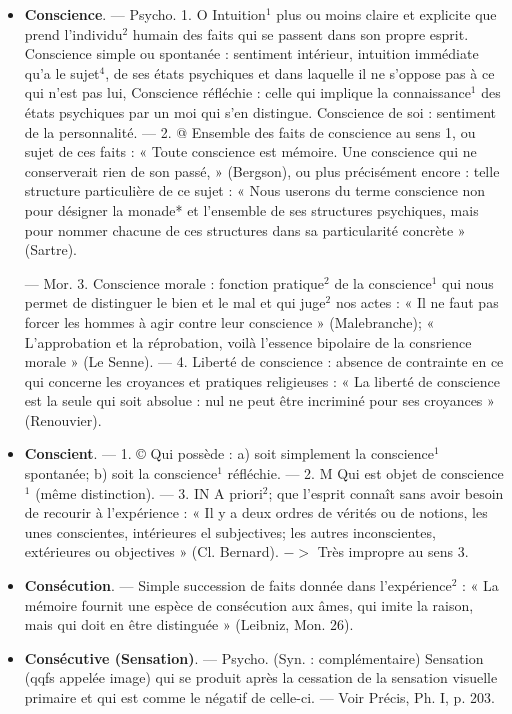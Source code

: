 \begin{itemize}[leftmargin=1cm, label=, itemsep=11pt]
\item {\bf Conscience}. — Psycho. 1. O Intuition$^1$
plus ou moins claire et explicite
que prend l'individu$^2$ humain des
faits qui se passent dans son propre
esprit. Conscience simple ou spontanée : sentiment intérieur, intuition
immédiate qu’a le sujet$^4$, de ses
états psychiques et dans laquelle il
ne s'oppose pas à ce qui n’est pas lui,
Conscience réfléchie : celle qui implique
la connaissance$^1$ des états psychiques par un moi qui s’en distingue. Conscience de soi : sentiment
de la personnalité. — 2. @ Ensemble
des faits de conscience au sens 1, ou
sujet de ces faits : « Toute conscience
est mémoire. Une conscience qui ne
conserverait rien de son passé, »
(Bergson), ou plus précisément encore : telle structure particulière de
ce sujet : « Nous userons du terme
conscience non pour désigner la monade* et l’ensemble de ses structures
psychiques, mais pour nommer chacune de ces structures dans sa particularité concrète » (Sartre).

— Mor. 3. Conscience morale :
fonction pratique$^2$ de la conscience$^1$
qui nous permet de distinguer le
bien et le mal et qui juge$^2$ nos actes :
« Il ne faut pas forcer les hommes à
agir contre leur conscience » (Malebranche); « L’approbation et la
réprobation, voilà l'essence bipolaire de la consrience morale » (Le
Senne). — 4. Liberté de conscience :
absence de contrainte en ce qui
concerne les croyances et pratiques
religieuses : « La liberté de conscience
est la seule qui soit absolue : nul ne
peut être incriminé pour ses croyances » (Renouvier).

\item {\bf Conscient}. — 1. © Qui possède : a) soit
simplement la conscience$^1$ spontanée; b) soit la conscience$^1$ réfléchie.
— 2. M Qui est objet de conscience$^1$
(même distinction). — 3. IN A priori$^2$;
que l'esprit connaît sans avoir besoin
de recourir à l’expérience : « Il y a
deux ordres de vérités ou de notions,
les unes conscientes, intérieures el
subjectives; les autres inconscientes,
extérieures ou objectives » (Cl. Bernard). $->$ Très impropre au
sens 3.

\item {\bf Consécution}. — Simple succession de
faits donnée dans l'expérience$^2$ :
« La mémoire fournit une espèce de
consécution aux âmes, qui imite la
raison, mais qui doit en être distinguée » (Leibniz, Mon. 26).

\item {\bf Consécutive (Sensation)}. — Psycho.
(Syn. : complémentaire) Sensation
(qqfs appelée image) qui se produit
après la cessation de la sensation
visuelle primaire et qui est comme
le négatif de celle-ci. — Voir Précis,
Ph. I, p. 203.


\end{itemize}
